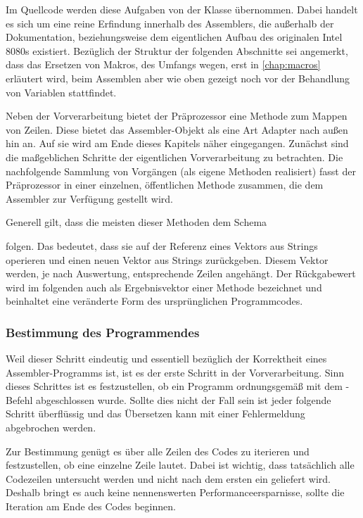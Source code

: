 Im Quellcode werden diese Aufgaben von der Klasse  übernommen. Dabei handelt es sich um eine reine Erfindung innerhalb des Assemblers, die außerhalb der Dokumentation, beziehungsweise dem eigentlichen Aufbau des originalen Intel 8080s existiert. Bezüglich der Struktur der folgenden Abschnitte sei angemerkt, dass das Ersetzen von Makros, des Umfangs wegen, erst in \ref{chap:macros} erläutert wird, beim Assemblen aber wie oben gezeigt noch vor der Behandlung von Variablen stattfindet.

Neben der Vorverarbeitung bietet der \glqq Präprozessor\grqq{} eine Methode zum Mappen von Zeilen. Diese bietet das Assembler-Objekt als eine Art Adapter nach außen hin an. Auf sie wird am Ende dieses Kapitels näher eingegangen. Zunächst sind die maßgeblichen Schritte der eigentlichen Vorverarbeitung zu betrachten. Die nachfolgende Sammlung von Vorgängen (als eigene Methoden realisiert) fasst der Präprozessor in einer einzelnen, öffentlichen Methode  zusammen, die dem Assembler zur Verfügung gestellt wird.

Generell gilt, dass die meisten dieser Methoden dem Schema

 folgen. Das bedeutet, dass sie auf der Referenz eines Vektors aus Strings operieren und einen neuen Vektor aus Strings zurückgeben. Diesem Vektor werden, je nach Auswertung, entsprechende Zeilen angehängt. Der Rückgabewert wird im folgenden auch als \glqq Ergebnisvektor\grqq{} einer Methode bezeichnet und beinhaltet eine veränderte Form des ursprünglichen Programmcodes.

\subsubsection{Bestimmung des Programmendes}

Weil dieser Schritt eindeutig und essentiell bezüglich der Korrektheit eines Assembler-Programms ist, ist es der erste Schritt in der Vorverarbeitung. Sinn dieses Schrittes ist es festzustellen, ob ein Programm ordnungsgemäß mit dem -Befehl abgeschlossen wurde. Sollte dies nicht der Fall sein ist jeder folgende Schritt überflüssig und das Übersetzen kann mit einer Fehlermeldung abgebrochen werden.

Zur Bestimmung genügt es über alle Zeilen des Codes zu iterieren und festzustellen, ob eine einzelne Zeile  lautet. Dabei ist wichtig, dass tatsächlich alle Codezeilen untersucht werden und nicht nach dem ersten  ein  geliefert wird. Deshalb bringt es auch keine nennenswerten Performanceersparnisse, sollte die Iteration am Ende des Codes beginnen. 

